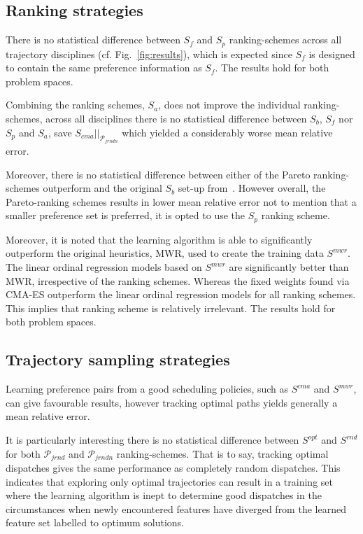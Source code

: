 \documentclass{svjour3}                     %
\begin{document}


 
 

\subsection{Ranking strategies}
There is no statistical difference between $S_f$ and $S_p$ ranking-schemes across all trajectory disciplines (cf. 
Fig.~\ref{fig:results}), which is expected since $S_f$ is designed to contain 
the same preference information as $S_f$. The results hold for both problem spaces. 

Combining the ranking schemes, $S_{a}$, does not improve the individual ranking-schemes, across all  disciplines there is no statistical difference between $S_b$, $S_f$ nor $S_p$ and $S_{a}$, save $S_{cma}|\big|_{\mathcal{P}_{jrndn}}$ which yielded a considerably worse mean relative error. 

Moreover, there is no statistical difference between either of the Pareto ranking-schemes outperform and the original $S_b$ set-up from~\cite{InRu11a}. However overall, the Pareto-ranking schemes results in lower mean relative error not to mention that a smaller preference set is preferred, it is opted to use the $S_{p}$ ranking scheme. 

Moreover, it is noted that the learning algorithm is able to significantly outperform the original heuristics, MWR, used to create the training data $S^{mwr}$. The linear ordinal regression models based on $S^{mwr}$ are significantly better than MWR, irrespective of the ranking schemes. Whereas the fixed weights found via CMA-ES outperform the linear ordinal regression models for all ranking schemes. This implies that ranking scheme is relatively irrelevant. The results hold for both problem spaces. 


\subsection{Trajectory sampling strategies}
Learning preference pairs from a good scheduling policies, such as $S^{cma}$ and $S^{mwr}$, can give favourable results, however tracking optimal paths yields generally a mean relative error. 

It is particularly interesting there is no statistical difference between $S^{opt}$ and $S^{rnd}$ for both 
$\mathcal{P}_{jrnd}$ and $\mathcal{P}_{jrndn}$ ranking-schemes. That is to say, tracking optimal dispatches gives the same performance as completely random dispatches. This indicates that exploring 
only optimal trajectories can result in a training set where the learning algorithm is inept to determine good 
dispatches in the circumstances when newly encountered features have diverged from the learned feature set labelled to optimum solutions. 
\end{document}

